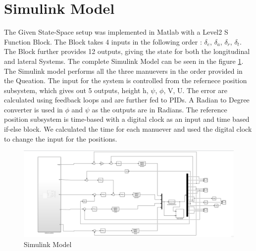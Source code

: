 \section{Simulink Model}
The Given State-Space setup was implemented in Matlab with a Level2 S Function Block. The Block takes 4 inputs in the following order : $\delta_{e}$, $\delta_{a}$, $\delta_{r}$, $\delta_{t}$. The Block further provides 12 outputs, giving the state for both the longitudinal and lateral Systems. The complete Simulink Model can be seen in the figure \ref{fig:fixed_wing_simulink}.\\

The Simulink model performs all the three manuevers in the order provided in the Queation. The input for the system is controlled from the refernece position subsystem, which gives out 5 outputs, height h, $\psi$, $\phi$, V, U. The error are calculated using feedback loops and are further fed to PIDs. A Radian to Degree converter is used in $\phi$ and $\psi$  as the outputs are in Radians. The reference position subsystem is time-based with a digital clock as an input and time based if-else block. We calculated the time for each manuever and used the digital clock to change the input for the positions. 

\begin{figure}
	\centering
	\includegraphics[width=1\textwidth]{Images/fixed_wing_simulink}
	\caption{Simulink Model}
	\label{fig:fixed_wing_simulink}
\end{figure}

